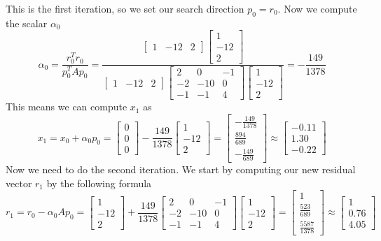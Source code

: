 \documentclass[12pt]{article}
\begin{document}
This is the first iteration, so we set our search direction $p_0=r_0$. Now we compute the scalar $\alpha_0$
$$
\alpha_0
=
\frac{r_0^Tr_0}{p_0^TAp_0}
=
\frac{
\begin{bmatrix}
1 & -12 & 2
\end{bmatrix}
\begin{bmatrix}
1 \\
-12 \\
2
\end{bmatrix}}{
\begin{bmatrix}
1 & -12 & 2
\end{bmatrix}
\begin{bmatrix}
2 & 0 & -1 \\
-2 & -10 & 0 \\
-1 & -1 & 4
\end{bmatrix}
\begin{bmatrix}
1 \\
-12 \\
2
\end{bmatrix}}
=
-\frac{149}{1378}
$$
This means we can compute $x_1$ as
$$
x_1=x_0+\alpha_0p_0
=
\begin{bmatrix}
0 \\
0 \\
0
\end{bmatrix}
-
\frac{149}{1378}
\begin{bmatrix}
1 \\
-12 \\
2
\end{bmatrix}
=
\begin{bmatrix}
-\frac{149}{1378} \\
\frac{894}{689} \\
-\frac{149}{689}
\end{bmatrix}
\approx
\begin{bmatrix}
-0.11 \\
1.30 \\
-0.22
\end{bmatrix}
$$
Now we need to do the second iteration. We start by computing our new residual vector $r_1$ by the following formula
$$
r_1=r_0-\alpha_0Ap_0=
\begin{bmatrix}
1 \\
-12 \\
2
\end{bmatrix}
+\frac{149}{1378}
\begin{bmatrix}
2 & 0 & -1 \\
-2 & -10 & 0 \\
-1 & -1 & 4
\end{bmatrix}
\begin{bmatrix}
1 \\
-12 \\
2
\end{bmatrix}
=
\begin{bmatrix}
1 \\
\frac{523}{689} \\
\frac{5587}{1378}
\end{bmatrix}
\approx
\begin{bmatrix}
1 \\
0.76 \\
4.05
\end{bmatrix}
$$
\end{document}
